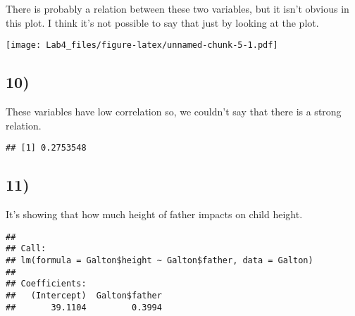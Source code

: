 \documentclass[
]{article}
\newenvironment{Shaded}{\begin{snugshade}}{\end{snugshade}}
\newcommand{\AttributeTok}[1]{\textcolor[rgb]{0.77,0.63,0.00}{#1}}
\newcommand{\FunctionTok}[1]{\textcolor[rgb]{0.00,0.00,0.00}{#1}}
\newcommand{\NormalTok}[1]{#1}
\newcommand{\SpecialCharTok}[1]{\textcolor[rgb]{0.00,0.00,0.00}{#1}}
\begin{document}
There is probably a relation between these two variables, but it isn't
obvious in this plot. I think it's not possible to say that just by
looking at the plot.

\begin{Shaded}
\end{Shaded}

\texttt{[image: Lab4\_files/figure-latex/unnamed-chunk-5-1.pdf]}

\hypertarget{section-9}{%
\subsection{10)}\label{section-9}}

These variables have low correlation so, we couldn't say that there is a
strong relation.

\begin{Shaded}
\end{Shaded}

\begin{verbatim}
## [1] 0.2753548
\end{verbatim}

\hypertarget{section-10}{%
\subsection{11)}\label{section-10}}

It's showing that how much height of father impacts on child height.

\begin{Shaded}
\end{Shaded}

\begin{verbatim}
## 
## Call:
## lm(formula = Galton$height ~ Galton$father, data = Galton)
## 
## Coefficients:
##   (Intercept)  Galton$father  
##       39.1104         0.3994
\end{verbatim}
\end{document}
